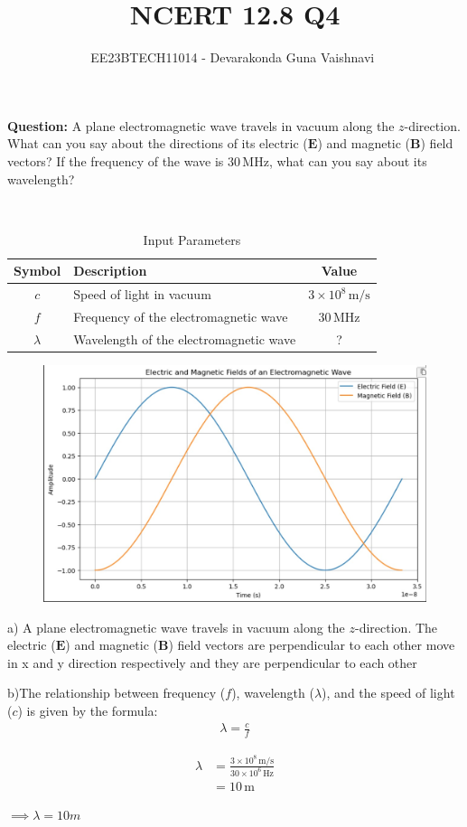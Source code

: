 \documentclass[a4,12pt,onecolumn]{IEEEtran}
\begin{document}
\title{NCERT 12.8 Q4}
\author{EE23BTECH11014 - Devarakonda Guna Vaishnavi $^{}$}
\textbf{Question:} A plane electromagnetic wave travels in vacuum along the \(z\)-direction. What can you say about the directions of its electric (\(\mathbf{E}\)) and magnetic (\(\mathbf{B}\)) field vectors? If the frequency of the wave is \(30 \, \text{MHz}\), what can you say about its wavelength?
 

\solution\\
\fi
\begin{table}[h]
    \centering
    \begin{tabular}{|c|l|c|}
\hline
Symbol & Description                               & Value                    \\ 
\hline
\(c\)    & Speed of light in vacuum                  & \(3 \times 10^8 \, \text{m/s}\) \\
\hline
\(f\)    & Frequency of the electromagnetic wave    & \(30 \, \text{MHz}\)     \\
\hline
\(\lambda\) & Wavelength of the electromagnetic wave   & ?                        \\ \hline
\end{tabular}
    \caption{Input Parameters}
    \label{table:parameters}
\end{table}

\begin{figure}[h!]
	\centering
	\includegraphics[width=\columnwidth]{figs/emplot.jpeg}
	\label{fig:plot}
\end{figure}

\textbf{} 
 a) A plane electromagnetic wave travels in vacuum along the \(z\)-direction. The electric (\(\mathbf{E}\)) and magnetic (\(\mathbf{B}\)) field vectors are perpendicular to each other move in x and y direction respectively and they are perpendicular to each other
 \vspace{0.2cm}

 b)The relationship between frequency (\(f\)), wavelength (\(\lambda\)), and the speed of light (\(c\)) is given by the formula:
\begin{align}
        \lambda = \frac{c}{f}
    \end{align}


\begin{align}
        \lambda &= \frac{3 \times 10^8 \, \text{m/s}}{30 \times 10^6 \, \text{Hz}} \\
        &= 10 \, \text{m}
    \end{align}
    
$\implies \lambda = 10m$
\end{document}
